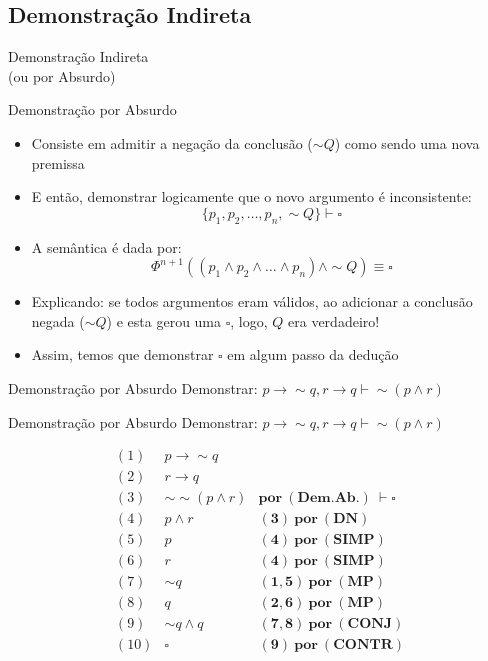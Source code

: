 \subsection{Demonstração Indireta}

\begin{frame}[t]
\vskip 3cm
\begin{center}
{\Huge Demonstração Indireta\\(ou por Absurdo)}
\end{center}
\end{frame}

\begin{frame}[t]{Demonstração por Absurdo}
	\begin{itemize}
	\item Consiste em admitir a negação da conclusão ($\sim Q$) como sendo uma nova premissa
	\item E então, demonstrar logicamente que o novo argumento é inconsistente: 
	$$\{p_1, p_2, \ldots, p_n, \sim Q \} \vdash \square$$
	
	\item A semântica é dada por: 
	$$\Phi^{n+1} ( (p_1 \wedge p_2 \wedge \ldots \wedge p_n) \wedge \sim Q ) \equiv \square$$
	
	\item Explicando: se todos argumentos eram válidos, ao adicionar
	a conclusão negada ($\sim Q$) e esta gerou uma $\square$, logo, $Q$ era
	verdadeiro!
 		
	\item Assim,  temos que demonstrar $\square$ em algum passo da dedução
	
	
	\end{itemize}
\end{frame}


\begin{frame}[t]{Demonstração por Absurdo}
	Demonstrar: $p \rightarrow\sim q, r \rightarrow q \vdash \sim (p \wedge r)$
\end{frame}

\begin{frame}[t]{Demonstração por Absurdo}
	Demonstrar: $p \rightarrow\sim q, r \rightarrow q \vdash \sim (p \wedge r)$
	
	\vskip 0.5cm
	
	$$\begin{array}{lll}
	(1) & p \rightarrow\sim q & \\
	(2) & r \rightarrow q & \\
	(3) & \sim\sim (p \wedge r) & \mathbf{por~(Dem.Ab.)~}\vdash\square \\
	\hline
	(4) & p \wedge r & \mathbf{(3)~por~(DN)} \\
	(5) & p & \mathbf{(4)~por~(SIMP)} \\
	(6) & r & \mathbf{(4)~por~(SIMP)} \\
	(7) & \sim q & \mathbf{(1,5)~por~(MP)} \\
	(8) & q & \mathbf{(2,6)~por~(MP)} \\
	(9) & \sim q \wedge q & \mathbf{(7,8)~por~(CONJ)} \\
	(10) & \square & \mathbf{(9)~por~(CONTR)} \\
	\end{array}$$	
\end{frame}



